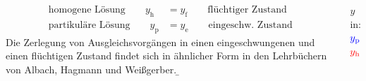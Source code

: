 \begin{frame}
\begin{columns}
{\begin{align}
        \text{homogene Lösung}\qquad y_{\mathrm{h}} &= y_{\mathrm{f}} \qquad \text{flüchtiger Zustand}\\
        \text{partikuläre Lösung}\qquad y_{\mathrm{p}} &= y_{\mathrm{e}} \qquad \text{eingeschw. Zustand}
    \end{align}
    Die Zerlegung von Ausgleichsvorgängen in einen eingeschwungenen und einen flüchtigen Zustand 
    findet sich in ähnlicher Form in den Lehrbüchern von Albach\cite{albach}, Hagmann\cite{hagmann} und Weißgerber\cite{weissgerber3}.  
}%
\b{%
     $y$ in:\\
     ${\color{blue}y_{\mathrm{p}}}$\\
     ${\color{red}y_{\mathrm{h}}}$

}
\end{columns}
\end{frame}
